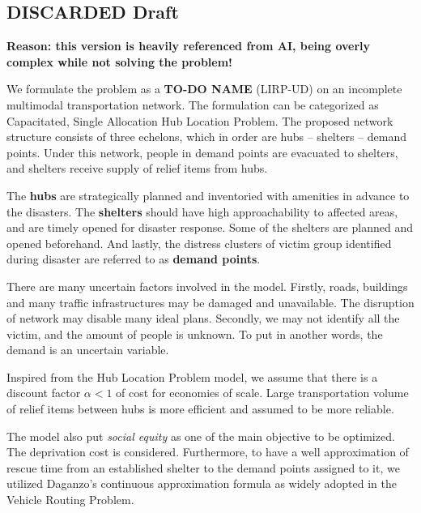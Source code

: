 \mycomment
{
\subsection{DISCARDED Draft}
\textbf{Reason: this version is heavily referenced from AI, being overly complex while not solving the problem!}

We formulate the problem as a \textbf{TO-DO NAME}  (LIRP-UD) on an incomplete multimodal transportation network. The formulation can be categorized as Capacitated, Single Allocation Hub Location Problem. The proposed network structure consists of three echelons, which in order are hubs -- shelters -- demand points. Under this network, people in demand points are evacuated to shelters, and shelters receive supply of relief items from hubs.

The \textbf{hubs} are strategically planned and inventoried with amenities in advance to the disasters. The \textbf{shelters} should have high approachability to affected areas, and are timely opened for disaster response. Some of the shelters are planned and opened beforehand. And lastly, the distress clusters of victim group identified during disaster are referred to as \textbf{demand points}. 

There are many uncertain factors involved in the model. Firstly, roads, buildings and many traffic infrastructures may be damaged and unavailable. The disruption of network may disable many ideal plans. Secondly, we may not identify all the victim, and the amount of people is unknown. To put in another words, the demand is an uncertain variable. 

Inspired from the Hub Location Problem model, we assume that there is a discount factor $\alpha < 1$ of cost for economies of scale. Large transportation volume of relief items between hubs is more efficient and assumed to be more reliable.

The model also put \textit{social equity} as one of the main objective to be optimized. The deprivation cost \cite{holguin2013appropriate} is considered. Furthermore, to have a well approximation of rescue time from an established shelter to the demand points assigned to it, we utilized Daganzo's continuous approximation formula \cite{daganzo2005logistics} as widely adopted in the Vehicle Routing Problem.

}

